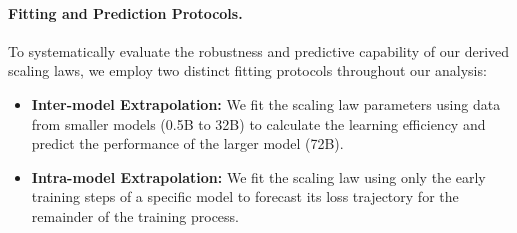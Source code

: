 \paragraph{Fitting and Prediction Protocols.}
To systematically evaluate the robustness and predictive capability of our derived scaling laws, we employ two distinct fitting protocols throughout our analysis:
\begin{itemize}
    \item \textbf{Inter-model Extrapolation:} We fit the scaling law parameters using data from smaller models (0.5B to 32B) to calculate the learning efficiency and predict the performance of the larger model (72B).
    \item \textbf{Intra-model Extrapolation:} We fit the scaling law using only the early training steps of a specific model to forecast its loss trajectory for the remainder of the training process. 
\end{itemize}
